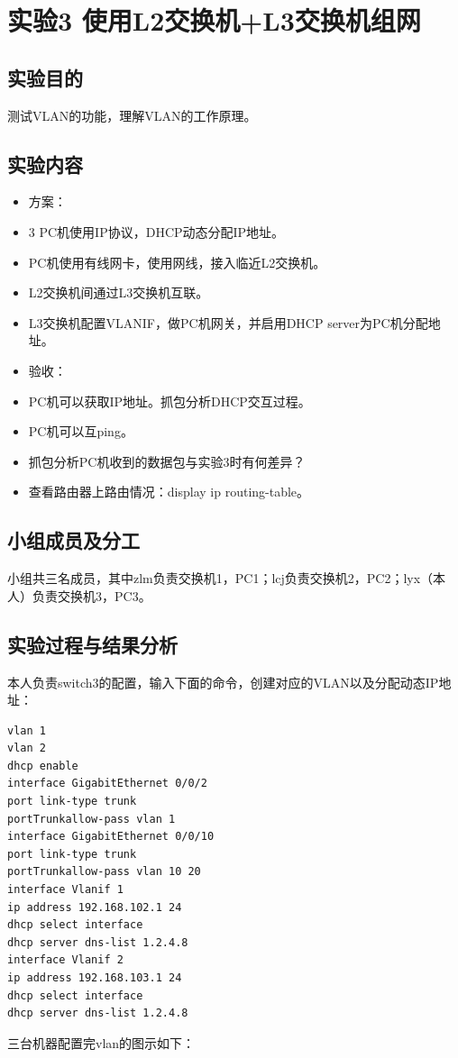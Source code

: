 \documentclass{article}
\begin{document}
\newpage\section{实验3 使用L2交换机+L3交换机组网}
\subsection{实验目的}
测试VLAN的功能，理解VLAN的工作原理。
\subsection{实验内容}
\begin{itemize}
    \item 方案：
    \item 3 PC机使用IP协议，DHCP动态分配IP地址。
    \item PC机使用有线网卡，使用网线，接入临近L2交换机。
    \item L2交换机间通过L3交换机互联。
    \item L3交换机配置VLANIF，做PC机网关，并启用DHCP server为PC机分配地址。
    \item 验收：
    \item PC机可以获取IP地址。抓包分析DHCP交互过程。
    \item PC机可以互ping。
    \item 抓包分析PC机收到的数据包与实验3时有何差异？
    \item 查看路由器上路由情况：display ip routing-table。
\end{itemize}
\subsection{小组成员及分工}
小组共三名成员，其中zlm负责交换机1，PC1；lcj负责交换机2，PC2；lyx（本人）负责交换机3，PC3。
\subsection{实验过程与结果分析}
本人负责switch3的配置，输入下面的命令，创建对应的VLAN以及分配动态IP地址：
\begin{lstlisting}
vlan 1
vlan 2
dhcp enable
interface GigabitEthernet 0/0/2
port link-type trunk
portTrunkallow-pass vlan 1
interface GigabitEthernet 0/0/10
port link-type trunk
portTrunkallow-pass vlan 10 20
interface Vlanif 1
ip address 192.168.102.1 24
dhcp select interface
dhcp server dns-list 1.2.4.8
interface Vlanif 2
ip address 192.168.103.1 24
dhcp select interface
dhcp server dns-list 1.2.4.8
\end{lstlisting}
三台机器配置完vlan的图示如下：
\end{document}

